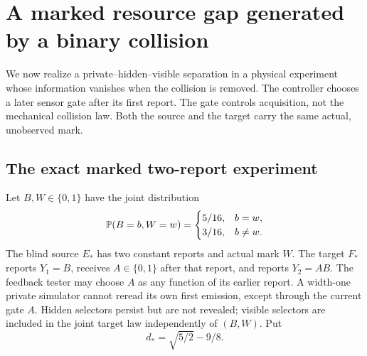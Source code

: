 \section{A marked resource gap generated by a binary collision}
\label{sec:v17-collision}

We now realize a private--hidden--visible separation in a physical
experiment whose information vanishes when the collision is removed.
The controller chooses a later sensor gate after its first report.
The gate controls acquisition, not the mechanical collision law.
Both the source and the target carry the same actual, unobserved mark.

\subsection{The exact marked two-report experiment}
Let $B,W\in\{0,1\}$ have the joint distribution
\begin{equation}\label{eq:v17-marktable}
 \mathbb P(B=b,W=w)=
 \begin{cases}5/16,&b=w,\\3/16,&b\ne w.\end{cases}
\end{equation}
The blind source $E_*$ has two constant reports and actual mark $W$.
The target $F_*$ reports $Y_1=B$, receives $A\in\{0,1\}$ after that
report, and reports $Y_2=AB$. The feedback tester may choose $A$ as
any function of its earlier report. A width-one private simulator
cannot reread its own first emission, except through the current gate
$A$. Hidden selectors persist but are not revealed; visible selectors
are included in the joint target law independently of $(B,W)$.
Put
\[
 d_* =\sqrt{5/2}-9/8.
\]

